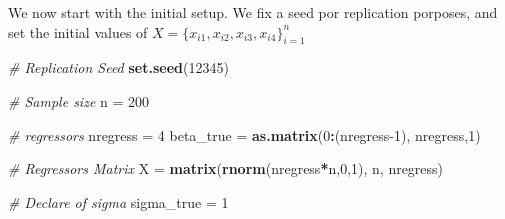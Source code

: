 \documentclass[
]{article}
\newenvironment{Shaded}{\begin{snugshade}}{\end{snugshade}}
\newcommand{\CommentTok}[1]{\textcolor[rgb]{0.56,0.35,0.01}{\textit{#1}}}
\newcommand{\ControlFlowTok}[1]{\textcolor[rgb]{0.13,0.29,0.53}{\textbf{#1}}}
\newcommand{\DataTypeTok}[1]{\textcolor[rgb]{0.13,0.29,0.53}{#1}}
\newcommand{\DecValTok}[1]{\textcolor[rgb]{0.00,0.00,0.81}{#1}}
\newcommand{\FloatTok}[1]{\textcolor[rgb]{0.00,0.00,0.81}{#1}}
\newcommand{\KeywordTok}[1]{\textcolor[rgb]{0.13,0.29,0.53}{\textbf{#1}}}
\newcommand{\NormalTok}[1]{#1}
\newcommand{\OperatorTok}[1]{\textcolor[rgb]{0.81,0.36,0.00}{\textbf{#1}}}
\newcommand{\OtherTok}[1]{\textcolor[rgb]{0.56,0.35,0.01}{#1}}
\newcommand{\StringTok}[1]{\textcolor[rgb]{0.31,0.60,0.02}{#1}}
\begin{document}
\begin{Shaded}
\end{Shaded}

We now start with the initial setup. We fix a seed por replication
porposes, and set the initial values of
\(X = \{x_{i1}, x_{i2}, x_{i3}, x_{i4} \}_{i=1}^{n}\)

\begin{Shaded}
\begin{Highlighting}[]
\CommentTok{# Replication Seed}
\KeywordTok{set.seed}\NormalTok{(}\DecValTok{12345}\NormalTok{)}

\CommentTok{# Sample size}
\NormalTok{n =}\StringTok{ }\DecValTok{200}

\CommentTok{# regressors}
\NormalTok{nregress =}\StringTok{ }\DecValTok{4}
\NormalTok{beta_true =}\StringTok{ }\KeywordTok{as.matrix}\NormalTok{(}\DecValTok{0}\OperatorTok{:}\NormalTok{(nregress}\DecValTok{-1}\NormalTok{), nregress,}\DecValTok{1}\NormalTok{)}

\CommentTok{# Regressors Matrix}
\NormalTok{X =}\StringTok{ }\KeywordTok{matrix}\NormalTok{(}\KeywordTok{rnorm}\NormalTok{(nregress}\OperatorTok{*}\NormalTok{n,}\DecValTok{0}\NormalTok{,}\DecValTok{1}\NormalTok{), n, nregress)}

\CommentTok{# Declare of sigma}
\NormalTok{sigma_true =}\StringTok{ }\DecValTok{1}
\end{Highlighting}
\end{Shaded}
\end{document}
